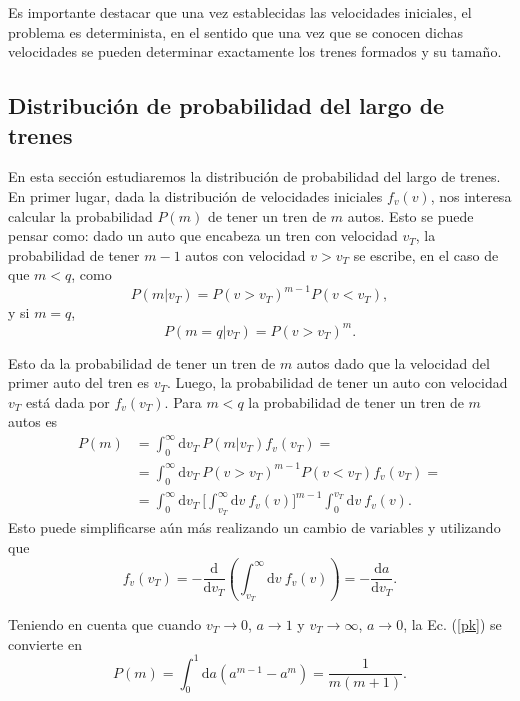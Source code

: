 \documentclass[letterpaper,12pt]{article}
\theoremstyle{plain}
\begin{document}
Es importante destacar que una vez establecidas las velocidades iniciales, el problema es determinista, en el sentido que una vez que se conocen dichas velocidades se pueden determinar exactamente los trenes formados y su tamaño.

\subsection{Distribución de probabilidad del largo de trenes \label{sec:distlargo}}

En esta sección estudiaremos la distribución de probabilidad del largo de trenes. En primer lugar, dada la distribución de velocidades iniciales $f_v(v)$, nos interesa calcular la probabilidad $P(m)$ de tener un tren de $m$ autos. Esto se puede pensar como: dado un auto que encabeza un tren con velocidad $v_T$, la probabilidad de tener $m-1$ autos con velocidad $v>v_T$ se escribe, en el caso de que $m < q$, como 
\begin{equation}
    P(m|v_T) = P(v>v_T)^{m-1} P(v<v_T),
\end{equation}
y si $m=q$,
\begin{equation}
    P(m=q|v_T) = P(v>v_T)^{m}.
\end{equation}

Esto da la probabilidad de tener un tren de $m$ autos dado que la velocidad del primer auto del tren es $v_T$. Luego, la probabilidad de tener un auto con velocidad $v_T$ está dada por $f_v(v_T)$. Para $m<q$ la probabilidad de tener un tren de $m$ autos es 
\begin{align}
    P(m) &= \int_0^{\infty} \text{d}v_T ~ P(m|v_T) f_v(v_T) = \\
    &=\int_0^{\infty} \text{d}v_T ~ P(v>v_T)^{m-1} P(v<v_T) f_v(v_T) = \\    
    &=  \int_0^{\infty} \text{d} v_T ~ \biggr[ \int_{v_T}^{\infty}\text{d}v ~f_v(v)  \biggr]^{m-1} \int_0^{v_T} \text{d}v ~f_v(v).
    \label{pk}
\end{align}
Esto puede simplificarse aún más realizando un cambio de variables y utilizando que
\begin{equation}
    f_v(v_T)=-\frac{\text{d}}{\text{d}v_T}\left(\int_{v_T}^{\infty}\text{d}v ~f_v(v)\right)=-\frac{\text{d}a}{\text{d}v_T}\text{.}
\end{equation}

Teniendo en cuenta que cuando $v_T \to 0$, $a \to 1$ y $v_T \to \infty$, $a \to 0$, la Ec. (\ref{pk}) se convierte en
\begin{equation}
    P(m)=\int_0^1 \text{d}a\left(a^{m-1}-a^{m}\right)=\frac{1}{m(m+1)}\text{.}
    \label{kk1}
\end{equation}
\end{document}
